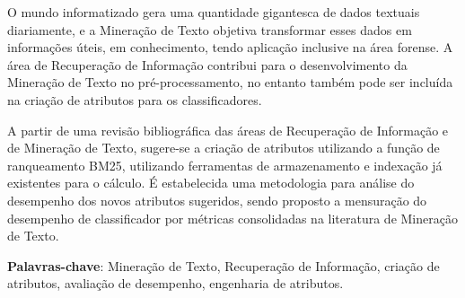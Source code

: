 \setlength{\absparsep}{18pt} %
\begin{resumo}
    
    O mundo informatizado gera uma quantidade gigantesca de dados textuais diariamente, e a Mineração de Texto objetiva transformar esses dados em informações úteis, em conhecimento, tendo aplicação inclusive na área forense.
    A área de Recuperação de Informação contribui para o desenvolvimento da Mineração de Texto no pré-processamento, no entanto também pode ser incluída na criação de atributos para os classificadores.
    
    A partir de uma revisão bibliográfica das áreas de Recuperação de Informação e de Mineração de Texto, sugere-se a criação de atributos utilizando a função de ranqueamento BM25, utilizando ferramentas de armazenamento e indexação já existentes para o cálculo.
    É estabelecida uma metodologia para análise do desempenho dos novos atributos sugeridos, sendo proposto a mensuração do desempenho de classificador por métricas consolidadas na literatura de Mineração de Texto.
    
    \vspace{\onelineskip}
    
	\noindent
    \textbf{Palavras-chave}: Mineração de Texto, Recuperação de Informação, criação de atributos, avaliação de desempenho, engenharia de atributos.
    
\end{resumo}